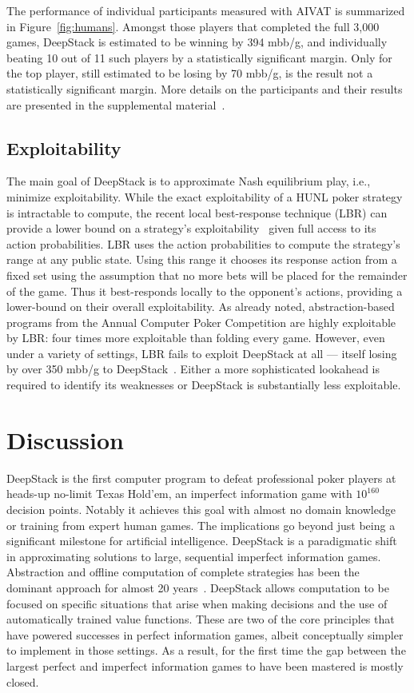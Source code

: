 \documentclass[12pt]{article}
\newcommand{\HUNL}{{HUNL}}
\begin{document}
The performance of individual participants measured with AIVAT is summarized in Figure~\ref{fig:humans}.
Amongst those players that completed the full 3,000 games, DeepStack is estimated to be winning by 394 mbb/g, and individually beating 10 out of 11 such players by a statistically significant margin.  Only for the top player, still estimated to be losing by 70 mbb/g, is the result not a statistically significant margin.
More details on the participants and their results are presented in the supplemental material~\cite{SOM}.

\subsection*{Exploitability}

The main goal of DeepStack is to approximate Nash equilibrium play, i.e., minimize exploitability.
While the exact exploitability of a \HUNL{} poker strategy is intractable to compute, the recent local best-response technique (LBR) can provide a lower bound on a strategy's exploitability~\cite{Lisy16:LocalBR} given full access to its action probabilities.  LBR uses the action probabilities to compute the strategy's range at any public state.  Using this range it chooses its response action from a fixed set using the  assumption that no more bets will be placed for the remainder of the game.  Thus it best-responds locally to the opponent's actions, providing a lower-bound on their overall exploitability.  As already noted, abstraction-based programs from the Annual Computer Poker Competition are highly exploitable by LBR: four times more exploitable than folding every game.  However, even under a variety of settings, LBR fails to exploit DeepStack at all --- itself losing by over 350 mbb/g to DeepStack~\cite{SOM}.  Either a more sophisticated lookahead is required to identify its weaknesses or DeepStack is substantially less exploitable. 

\section*{Discussion}

DeepStack is the first computer program to defeat professional poker players at heads-up no-limit Texas Hold'em, an imperfect information game with $10^{160}$ decision points.  Notably it achieves this goal with almost no domain knowledge or training from expert human games.  The implications go beyond just being a significant milestone for artificial intelligence.  DeepStack is a paradigmatic shift in approximating solutions to large, sequential imperfect information games.  
Abstraction and offline computation of complete strategies has been the dominant approach for almost 20 years~\cite{Shi00:Rhode,BillingsEtAl03,Sandholm12}.  
DeepStack allows computation to be focused on specific situations that arise when making decisions and the use of automatically trained value functions.  These are two of the core principles that have powered successes in perfect information games, albeit conceptually simpler to implement in those settings.  As a result, for the first time the gap between the largest perfect and imperfect information games to have been mastered is mostly closed.
\end{document}
